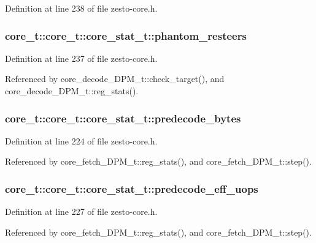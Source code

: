 Definition at line 238 of file zesto-core.h.
\subsubsection[{phantom\_\-resteers}]{ core\_\-t::core\_\-t::core\_\-stat\_\-t::phantom\_\-resteers}\label{structcore__t_1_1core__stat__t_c8afe12f113023f74a2cce332d2b3e4d}




Definition at line 237 of file zesto-core.h.

Referenced by core\_\-decode\_\-DPM\_\-t::check\_\-target(), and core\_\-decode\_\-DPM\_\-t::reg\_\-stats().
\subsubsection[{predecode\_\-bytes}]{ core\_\-t::core\_\-t::core\_\-stat\_\-t::predecode\_\-bytes}\label{structcore__t_1_1core__stat__t_ca26cafac57267553a96525e1c7d1310}




Definition at line 224 of file zesto-core.h.

Referenced by core\_\-fetch\_\-DPM\_\-t::reg\_\-stats(), and core\_\-fetch\_\-DPM\_\-t::step().
\subsubsection[{predecode\_\-eff\_\-uops}]{ core\_\-t::core\_\-t::core\_\-stat\_\-t::predecode\_\-eff\_\-uops}\label{structcore__t_1_1core__stat__t_eceebbbc9b6e6928cafaee46f39fccce}




Definition at line 227 of file zesto-core.h.

Referenced by core\_\-fetch\_\-DPM\_\-t::reg\_\-stats(), and core\_\-fetch\_\-DPM\_\-t::step().
